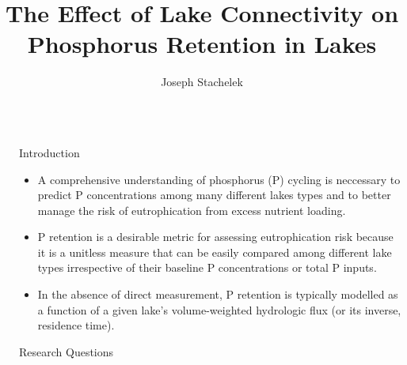 \documentclass[final,hyperref={pdfpagelabels=false}]{beamer}
\title{\huge The Effect of Lake Connectivity on Phosphorus Retention in Lakes} %
\author{Joseph Stachelek} %
\institute{Department of Fisheries and Wildlife, Michigan State University, MI, USA} %
\begin{document}

\begin{frame}[t] %

\begin{columns}[t] %

\begin{column}{.02\textwidth}\end{column} %

\begin{column}{.465\textwidth} %

            
\begin{block}{Introduction}

\begin{itemize}
\item A comprehensive understanding of phosphorus (P) cycling is neccessary to predict P concentrations among many different lakes types and to better manage the risk of eutrophication from excess nutrient loading.
\item P retention is a desirable metric for assessing eutrophication risk because it is a unitless measure that can be easily compared among different lake types irrespective of their baseline P concentrations or total P inputs.
\item In the absence of direct measurement, P retention is typically modelled as a function of a given lake's volume-weighted hydrologic flux (or its inverse, \alert{residence time}).
\end{itemize}

\end{block}

{
\begin{block}{Research Questions}


\end{block}}
\end{column}
\end{columns}
\end{frame}
\end{document}
